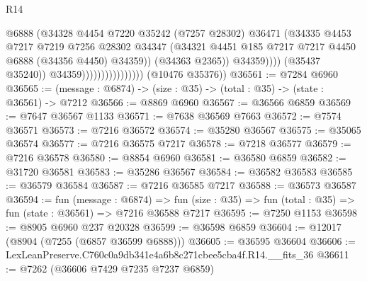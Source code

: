 \begin{lexlean}{R14}
\begin{coremodule}
                                                @6888
                                                (@34328
                                                  @4454
                                                  @7220
                                                  @35242
                                                  (@7257 @28302)
                                                  @36471
                                                  (@34335
                                                    @4453
                                                    @7217
                                                    @7219
                                                    @7256
                                                    @28302
                                                    @34347
                                                    (@34321
                                                      @4451
                                                      @185
                                                      @7217
                                                      @7217
                                                      @4450
                                                      @6888
                                                      (@34356 @4450)
                                                      @34359))
                                                  (@34363 @2365))
                                                @34359))))
                                        (@35437 @35240))
                                      @34359))))))))))))))))
      (@10476 @35376))
@36561 := @7284 @6960
@36565 := (message : @6874) -> (size : @35) -> (total : @35) -> (state : @36561) -> @7212
@36566 := @8869 @6960
@36567 := @36566 @6859
@36569 := @7647 @36567 @1133
@36571 := @7638 @36569 @7663
@36572 := @7574 @36571
@36573 := @7216 @36572
@36574 := @35280 @36567
@36575 := @35065 @36574
@36577 := @7216 @36575 @7217
@36578 := @7218 @36577
@36579 := @7216 @36578
@36580 := @8854 @6960
@36581 := @36580 @6859
@36582 := @31720 @36581
@36583 := @35286 @36567
@36584 := @36582 @36583
@36585 := @36579 @36584
@36587 := @7216 @36585 @7217
@36588 := @36573 @36587
@36594 := fun (message : @6874) =>
  fun (size : @35) => fun (total : @35) => fun (state : @36561) => @7216 @36588 @7217
@36595 := @7250 @1153
@36598 := @8905 @6960 @237 @20328
@36599 := @36598 @6859
@36604 := @12017 (@8904 (@7255 (@6857 @36599 @6888)))
@36605 := @36595 @36604
@36606 := LexLeanPreserve.C760c0a9db341e4a6b8c271cbee5cba4f.R14.__fits_36
@36611 := @7262 (@36606 @7429 @7235 @7237 @6859)

\end{coremodule}
\end{lexlean}
